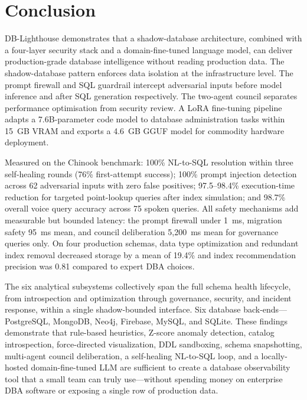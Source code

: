 \documentclass[conference]{IEEEtran}
\begin{document}
\section{Conclusion}

DB-Lighthouse demonstrates that a shadow-database architecture, combined
with a four-layer security stack and a domain-fine-tuned language model,
can deliver production-grade database intelligence without reading
production data. The shadow-database pattern enforces data isolation at
the infrastructure level. The prompt firewall and SQL guardrail intercept
adversarial inputs before model inference and after SQL generation
respectively. The two-agent council separates performance optimisation from
security review. A LoRA fine-tuning pipeline adapts a 7.6B-parameter
code model to database administration tasks within 15~GB VRAM and exports
a 4.6~GB GGUF model for commodity hardware deployment.

Measured on the Chinook benchmark: 100\% NL-to-SQL resolution within
three self-healing rounds (76\% first-attempt success); 100\% prompt
injection detection across 62 adversarial inputs with zero false positives;
97.5--98.4\% execution-time reduction for targeted point-lookup queries
after index simulation; and 98.7\% overall voice query accuracy across 75
spoken queries. All safety mechanisms add measurable but bounded latency:
the prompt firewall under 1~ms, migration safety 95~ms mean, and council
deliberation 5,200~ms mean for governance queries only. On four production
schemas, data type optimization and redundant index removal decreased
storage by a mean of 19.4\% and index recommendation precision was 0.81
compared to expert DBA choices.

The six analytical subsystems collectively span the full schema health
lifecycle, from introspection and optimization through governance,
security, and incident response, within a single shadow-bounded interface.
Six database back-ends---PostgreSQL, MongoDB, Neo4j, Firebase, MySQL, and
SQLite. These findings demonstrate that rule-based heuristics, Z-score
anomaly detection, catalog introspection, force-directed visualization,
DDL sandboxing, schema snapshotting, multi-agent council deliberation, a
self-healing NL-to-SQL loop, and a locally-hosted domain-fine-tuned LLM
are sufficient to create a database observability tool that a small team
can truly use---without spending money on enterprise DBA software or
exposing a single row of production data.
\end{document}

